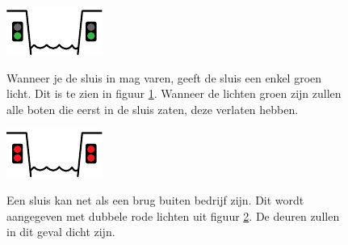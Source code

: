 \vspace{-0.35cm}
\begin{figure}[H]
	\centering
	\begin{minipage}[b]{0.18\textwidth}	
		\includegraphics[width=\textwidth]{Hoofdstukken/Bruggen/pdf/sluis_toegestaan.pdf}
		\caption{}
		\label{pic:sluis:toegestaan}
	\end{minipage}
	\hfill
	\begin{minipage}[t]{0.75\textwidth}
		\vspace{-2cm}
		Wanneer je de sluis in mag varen, geeft de sluis een enkel groen licht. Dit is te zien in figuur \ref{pic:sluis:toegestaan}. Wanneer de lichten groen zijn zullen alle boten die eerst in de sluis zaten, deze verlaten hebben. 
	\end{minipage}
\end{figure}
\vspace{-0.35cm}
\begin{figure}[H]
	\centering
	\begin{minipage}[b]{0.18\textwidth}	
		\includegraphics[width=\textwidth]{Hoofdstukken/Bruggen/pdf/sluis_buiten_dienst_dicht.pdf}
		\caption{}
		\label{pic:sluis:buiten}
	\end{minipage}
	\hfill
	\begin{minipage}[t]{0.75\textwidth}
		\vspace{-2cm}
		Een sluis kan net als een brug buiten bedrijf zijn. Dit wordt aangegeven met dubbele rode lichten uit figuur \ref{pic:sluis:buiten}. De deuren zullen in dit geval dicht zijn.
	\end{minipage}
\end{figure}
